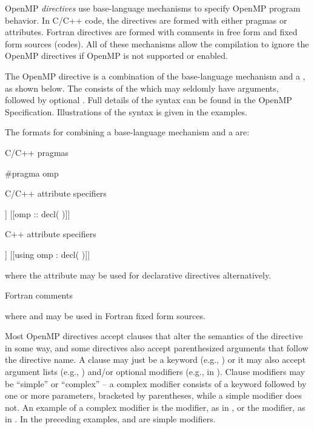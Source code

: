 \label{chap:directive_syntax}

OpenMP \emph{directives} use base-language mechanisms to specify OpenMP program behavior.
In C/C++ code, the directives are formed with 
either pragmas or attributes.
Fortran directives are formed with comments in free form and fixed form sources (codes).
All of these mechanisms allow the compilation to ignore the OpenMP directives if
OpenMP is not supported or enabled.


The OpenMP directive is a combination of the base-language mechanism and a ,
as shown below. The  consists
of the  which may seldomly have arguments, 
followed by optional . Full details of the syntax can be found in the OpenMP Specification.
Illustrations of the syntax is given in the examples.

The formats for combining a base-language mechanism and a  are:

C/C++ pragmas
\begin{indentedcodelist}
#pragma omp 
\end{indentedcodelist}

C/C++ attribute specifiers
\begin{indentedcodelist}
[[omp :: directive( \plc{directive-specification} )]]
[[omp :: decl(  )]]
\end{indentedcodelist}

C++ attribute specifiers
\begin{indentedcodelist}
[[using omp : directive( \plc{directive-specification} )]]
[[using omp : decl(  )]]
\end{indentedcodelist}

where the  attribute may be used for declarative
directives alternatively.

Fortran comments

where  and  may be used in Fortran fixed form sources.

Most OpenMP directives accept clauses that alter the semantics of the directive in some way, 
and some directives also accept parenthesized arguments that follow the directive name. 
A clause may just be a keyword (e.g., ) or it may also accept argument lists 
(e.g., ) and/or optional modifiers (e.g.,  in 
).
Clause modifiers may be ``simple'' or ``complex'' -- a complex modifier consists of a
keyword followed by one or more parameters, bracketed by parentheses, while a simple 
modifier does not. An example of a complex modifier is the  modifier, 
as in , or the  modifier, as in 
. 
In the preceding examples,  and  are simple modifiers.

